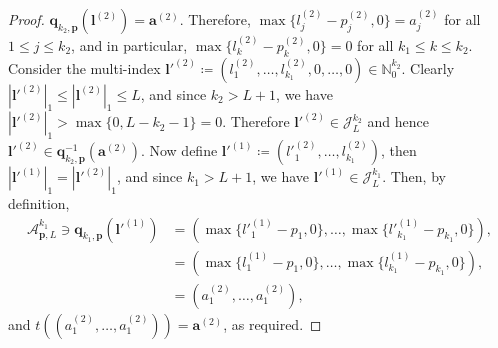 \documentclass[pdflatex,sn-mathphys-num]{sn-jnl}%
\theoremstyle{thmstyleone}%
\theoremstyle{thmstyletwo}%
\theoremstyle{thmstylethree}%
\begin{document}
\begin{proof}
    \(\mathbf{q}_{k_2,\mathbf{p}}(\boldsymbol{l}^{(2)})=\mathbf{a}^{(2)}\). Therefore, \(\max\{l_j^{(2)}-p_j^{(2)},0\}=a_j^{(2)}\) for all \(1\leq j\leq k_2\), and in particular, \(\max\{l_k^{(2)}-p_k^{(2)},0\}=0\) for all \(k_1\leq k\leq k_2\). Consider the multi-index \(\boldsymbol{l}'^{(2)}\coloneqq(l_{1}^{(2)},\dots,l_{k_1}^{(2)},0,\dots,0)\in\mathbb{N}_0^{k_2}\). Clearly \(|\boldsymbol{l}'^{(2)}|_1\leq|\boldsymbol{l}^{(2)}|_1\leq L\), and since \(k_2>L+1\), we have \(|\boldsymbol{l}'^{(2)}|_1>\max\{0,L-k_2-1\}=0\). Therefore \(\boldsymbol{l}'^{(2)}\in\mathcal{J}_L^{k_2}\) and hence \(\boldsymbol{l}'^{(2)}\in\mathbf{q}_{k_2,\mathbf{p}}^{-1}(\mathbf{a}^{(2)})\). Now define \(\boldsymbol{l}'^{(1)}\coloneqq(l'^{(2)}_1,\dots,l_{k_1}^{(2)})\), then \(|\boldsymbol{l}'^{(1)}|_1=|\boldsymbol{l}'^{(2)}|_1\), and since \(k_1>L+1\), we have \(\boldsymbol{l}'^{(1)}\in\mathcal{J}_{L}^{k_1}\). Then, by definition,
    \begin{align}
        \mathcal{A}_{\mathbf{p},L}^{k_1}\ni\mathbf{q}_{k_1,\mathbf{p}}(\boldsymbol{l}'^{(1)})&=(\max\{l'^{(1)}_1-p_1,0\},\dots,\max\{l'^{(1)}_{k_1}-p_{k_1},0\}),\nonumber\\
        &=(\max\{l^{(1)}_1-p_1,0\},\dots,\max\{l^{(1)}_{k_1}-p_{k_1},0\}),\nonumber\\
        &=(a_1^{(2)},\dots,a_1^{(2)}),\nonumber
    \end{align}
    and \(t((a_1^{(2)},\dots,a_1^{(2)}))=\mathbf{a}^{(2)}\), as required.
\end{proof}
\end{document}
